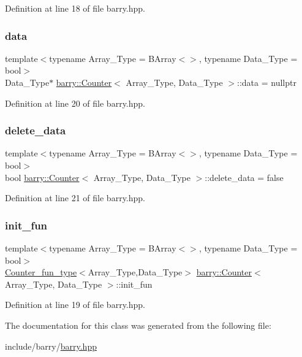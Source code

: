 Definition at line 18 of file barry.\+hpp.

\mbox{\label{classbarry_1_1_counter_af8196eeaaa4b58b788969c07aee7f1ee}} 
\subsubsection{\texorpdfstring{data}{data}}
{\footnotesize\ttfamily template$<$typename Array\+\_\+\+Type  = B\+Array$<$$>$, typename Data\+\_\+\+Type  = bool$>$ \\
Data\+\_\+\+Type$\ast$ \hyperlink{classbarry_1_1_counter}{barry\+::\+Counter}$<$ Array\+\_\+\+Type, Data\+\_\+\+Type $>$\+::data = nullptr}



Definition at line 20 of file barry.\+hpp.

\mbox{\label{classbarry_1_1_counter_a5445fa47abeff4b5675a5e5c12e4917a}} 
\subsubsection{\texorpdfstring{delete\+\_\+data}{delete\_data}}
{\footnotesize\ttfamily template$<$typename Array\+\_\+\+Type  = B\+Array$<$$>$, typename Data\+\_\+\+Type  = bool$>$ \\
bool \hyperlink{classbarry_1_1_counter}{barry\+::\+Counter}$<$ Array\+\_\+\+Type, Data\+\_\+\+Type $>$\+::delete\+\_\+data = false}



Definition at line 21 of file barry.\+hpp.

\mbox{\label{classbarry_1_1_counter_a2509d75d3fc9e33d708911a38373d8ab}} 
\subsubsection{\texorpdfstring{init\+\_\+fun}{init\_fun}}
{\footnotesize\ttfamily template$<$typename Array\+\_\+\+Type  = B\+Array$<$$>$, typename Data\+\_\+\+Type  = bool$>$ \\
\hyperlink{namespacebarry_abaaae3200da8e4b7faac3c04fe9c3081}{Counter\+\_\+fun\+\_\+type}$<$Array\+\_\+\+Type,Data\+\_\+\+Type$>$ \hyperlink{classbarry_1_1_counter}{barry\+::\+Counter}$<$ Array\+\_\+\+Type, Data\+\_\+\+Type $>$\+::init\+\_\+fun}



Definition at line 19 of file barry.\+hpp.



The documentation for this class was generated from the following file\+:\begin{DoxyCompactItemize}
\item 
include/barry/\hyperlink{barry_8hpp}{barry.\+hpp}\end{DoxyCompactItemize}
